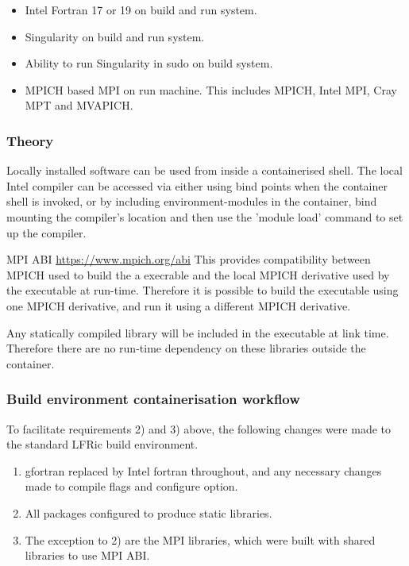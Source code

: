 \documentclass[12pt]{article}
\begin{document}
  \begin{itemize}
\item Intel Fortran 17 or 19 on build and run system. 
\item Singularity on build and run system.
\item Ability to run Singularity in sudo on build system.
\item MPICH based MPI on run machine. This includes MPICH, Intel MPI, Cray MPT
and MVAPICH.
\end{itemize}

\subsubsection*{Theory}
    
Locally installed software can be used from inside a containerised shell. The local Intel compiler can be accessed via either using bind points when the container shell is invoked, or by including environment-modules in the container, bind mounting the compiler's location and then use the 'module load' command to set up the compiler.

MPI ABI \url{https://www.mpich.org/abi} This provides compatibility between MPICH used to build the a execrable and the local MPICH derivative used by the executable at run-time. Therefore it is possible to build the executable using one MPICH derivative, and run it using a different MPICH derivative.

Any statically compiled library will be included in the executable at link time.  Therefore there are no run-time dependency on these libraries outside the container.

\subsubsection*{Build environment containerisation workflow}


To facilitate requirements 2) and 3) above, the following changes were made to the standard LFRic build environment.

\begin{enumerate}
\item gfortran replaced by Intel fortran throughout, and any necessary changes made to compile flags and configure option.

\item All packages configured to produce static libraries. 

\item The exception to 2) are the MPI libraries, which were built with shared libraries to use MPI ABI. 
\end{enumerate}
\end{document}
